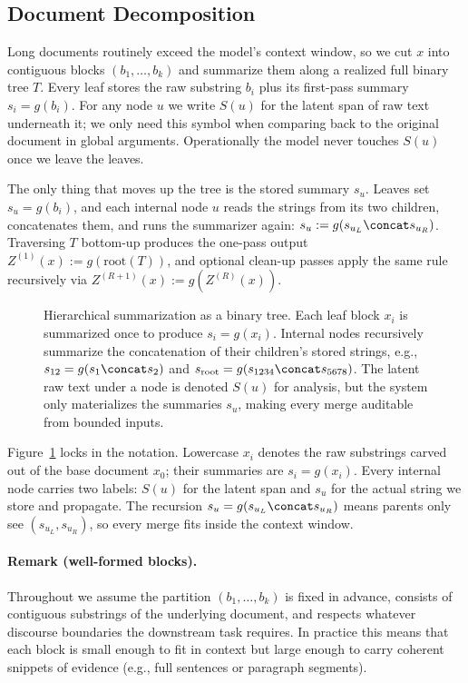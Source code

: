 \subsection{Document Decomposition}

Long documents routinely exceed the model's context window, so we cut $x$ into contiguous blocks $(b_1, \ldots, b_k)$ and summarize them along a realized full binary tree $T$. Every leaf stores the raw substring $b_i$ plus its first-pass summary $s_i = g(b_i)$. For any node $u$ we write $S(u)$ for the latent span of raw text underneath it; we only need this symbol when comparing back to the original document in global arguments. Operationally the model never touches $S(u)$ once we leave the leaves.

The only thing that moves up the tree is the stored summary $s_u$. Leaves set $s_u = g(b_i)$, and each internal node $u$ reads the strings from its two children, concatenates them, and runs the summarizer again: $s_u := g(s_{u_L} \concat s_{u_R})$. Traversing $T$ bottom-up produces the one-pass output $Z^{(1)}(x) := g(\text{root}(T))$, and optional clean-up passes apply the same rule recursively via $Z^{(R+1)}(x) := g(Z^{(R)}(x))$.

\begin{figure}[t]
    \centering
    
    \caption{Hierarchical summarization as a binary tree. Each leaf block $x_i$ is summarized once to produce $s_i = g(x_i)$. Internal nodes recursively summarize the concatenation of their children's stored strings, e.g., $s_{12} = g(s_1 \concat s_2)$ and $s_{\mathrm{root}} = g(s_{1234} \concat s_{5678})$. The latent raw text under a node is denoted $S(u)$ for analysis, but the system only materializes the summaries $s_u$, making every merge auditable from bounded inputs.}
    \label{fig:hierarchical_summarization}
\end{figure}

Figure~\ref{fig:hierarchical_summarization} locks in the notation. Lowercase $x_i$ denotes the raw substrings carved out of the base document $x_0$; their summaries are $s_i = g(x_i)$. Every internal node carries two labels: $S(u)$ for the latent span and $s_u$ for the actual string we store and propagate. The recursion $s_u = g(s_{u_L} \concat s_{u_R})$ means parents only see $(s_{u_L}, s_{u_R})$, so every merge fits inside the context window.

\paragraph{Remark (well-formed blocks).}
Throughout we assume the partition $(b_1, \ldots, b_k)$ is fixed in advance, consists of contiguous substrings of the underlying document, and respects whatever discourse boundaries the downstream task requires. In practice this means that each block is small enough to fit in context but large enough to carry coherent snippets of evidence (e.g., full sentences or paragraph segments).

